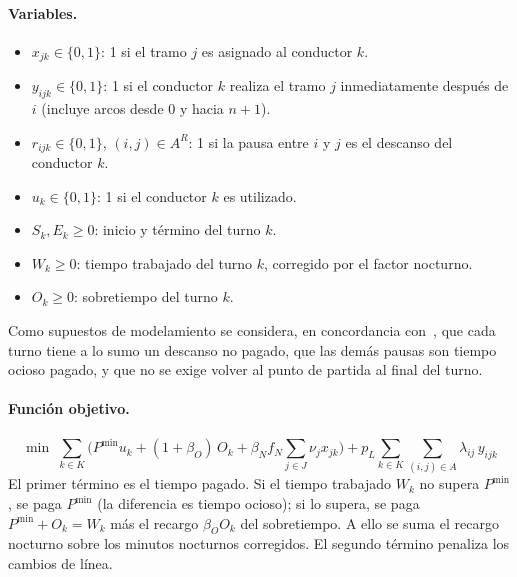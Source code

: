 \documentclass[letter, 10pt]{article}
\begin{document}
\paragraph{Variables.}
\begin{itemize}
\item $x_{jk}\in\{0,1\}$: 1 si el tramo $j$ es asignado al conductor $k$.
\item $y_{ijk}\in\{0,1\}$: 1 si el conductor $k$ realiza el tramo $j$ inmediatamente después de $i$ (incluye arcos desde $0$ y hacia $n{+}1$).
\item $r_{ijk}\in\{0,1\}$, $(i,j)\in A^R$: 1 si la pausa entre $i$ y $j$ es el descanso del conductor $k$.
\item $u_k\in\{0,1\}$: 1 si el conductor $k$ es utilizado.
\item $S_k, E_k\geq 0$: inicio y término del turno $k$.
\item $W_k\geq 0$: tiempo trabajado del turno $k$, corregido por el factor nocturno.
\item $O_k\geq 0$: sobretiempo del turno $k$.
\end{itemize}
Como supuestos de modelamiento se considera, en concordancia con~\cite{Constantino2017}, que cada turno tiene a lo sumo un descanso no pagado, que las demás pausas son tiempo ocioso pagado, y que no se exige volver al punto de partida al final del turno.

\paragraph{Función objetivo.}
\begin{equation}
\min\; \sum_{k\in K}\Big( P^{\min}u_k + (1+\beta_O)\,O_k + \beta_N f_N \sum_{j\in J}\nu_j x_{jk}\Big) + p_L\sum_{k\in K}\sum_{(i,j)\in A}\lambda_{ij}\,y_{ijk}
\label{eq:fo}
\end{equation}
El primer término es el tiempo pagado. Si el tiempo trabajado $W_k$ no supera $P^{\min}$, se paga $P^{\min}$ (la diferencia es tiempo ocioso); si lo supera, se paga $P^{\min}+O_k=W_k$ más el recargo $\beta_O O_k$ del sobretiempo. A ello se suma el recargo nocturno sobre los minutos nocturnos corregidos. El segundo término penaliza los cambios de línea.
\end{document}
